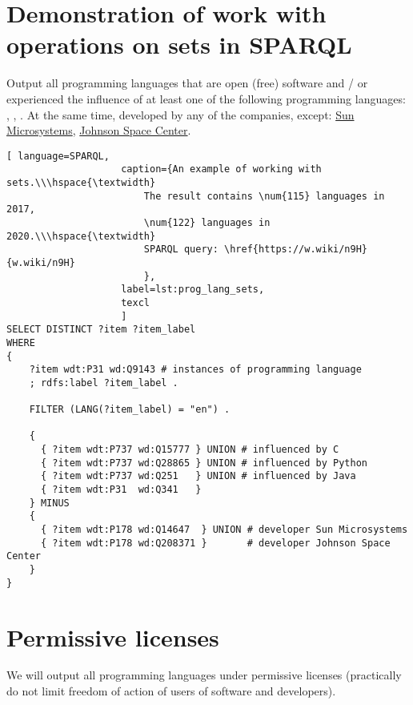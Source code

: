 \section{Demonstration of work with operations on sets in SPARQL}

Output all programming languages that are open (free) software and / or experienced the influence of at least one of the following programming languages: , , . At the same time, developed by any of the companies, except: \href{https://en.wikipedia.org/wiki/Sun_Microsystems}{Sun Microsystems}, \href{https://en.wikipedia.org/wiki/Johnson_Space_Center}{Johnson Space Center}.

\begin{lstlisting}[ language=SPARQL, 
                    caption={An example of working with sets.\\\hspace{\textwidth}
                        The result contains \num{115} languages in 2017, 
                        \num{122} languages in 2020.\\\hspace{\textwidth}
                        SPARQL query: \href{https://w.wiki/n9H}{w.wiki/n9H}
                        },
                    label=lst:prog_lang_sets,
                    texcl 
                    ]
SELECT DISTINCT ?item ?item_label
WHERE
{
    ?item wdt:P31 wd:Q9143 # instances of programming language
    ; rdfs:label ?item_label . 

    FILTER (LANG(?item_label) = "en") . 

    {
      { ?item wdt:P737 wd:Q15777 } UNION # influenced by C
      { ?item wdt:P737 wd:Q28865 } UNION # influenced by Python
      { ?item wdt:P737 wd:Q251   } UNION # influenced by Java
      { ?item wdt:P31  wd:Q341   }
    } MINUS 
  	{ 
      { ?item wdt:P178 wd:Q14647  } UNION # developer Sun Microsystems
      { ?item wdt:P178 wd:Q208371 }       # developer Johnson Space Center
    }  
}
\end{lstlisting}%

\section{Permissive licenses}
We will output all programming languages under permissive licenses (practically do not limit freedom of action of users of software and developers).

